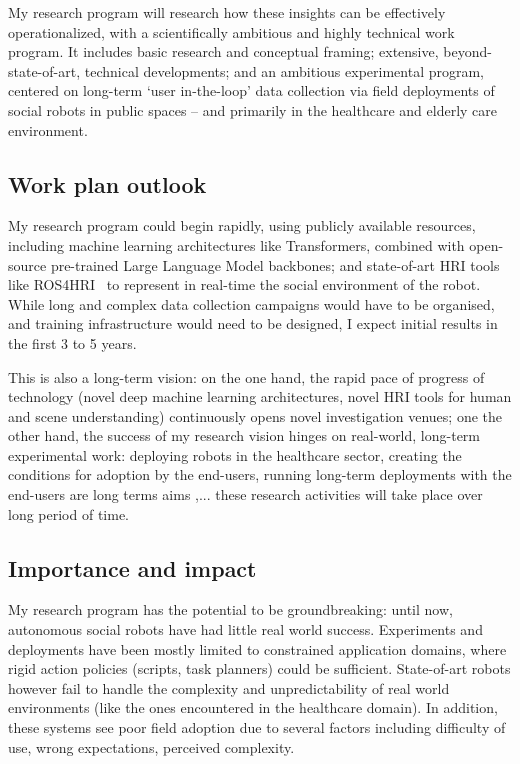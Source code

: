 \vspace{0.4em}

My research program will research how these insights can be effectively
operationalized, with a scientifically ambitious
and highly technical work program. It includes basic research and conceptual
framing; extensive, beyond-state-of-art, technical developments; and an
ambitious experimental program, centered on long-term `user in-the-loop' data
collection via field deployments of social
robots in public spaces -- and primarily in the healthcare and elderly care
environment.


\subsection{Work plan outlook}

My research program could begin rapidly, using publicly available resources,
including machine learning architectures like Transformers, combined with open-source
pre-trained Large Language Model backbones; and state-of-art HRI tools like
ROS4HRI~\autocite{mohamed2021ros4hri} to represent in real-time the social
environment of the robot. While long and complex data collection campaigns would
have to be organised, and training infrastructure would need to
be designed, I expect initial results in the first 3 to 5 years.

This is also a long-term vision: on the one hand, the rapid pace of progress
of technology (novel deep machine learning architectures, novel HRI tools for
human and scene understanding) continuously opens novel investigation
venues; one the other hand, the success of my research vision hinges on
real-world, long-term experimental work: deploying robots in the healthcare
sector, creating the conditions for adoption by the end-users, running
long-term deployments with the end-users are long terms aims
,... these research activities will take
place over long period of time.

\subsection{Importance and impact}

My research program has the potential to be groundbreaking: until now,
autonomous social robots have had little real world success. Experiments and
deployments have been mostly limited to constrained application domains, where
rigid action policies (scripts, task planners) could be sufficient. State-of-art
robots however fail to handle the complexity and unpredictability of real world
environments (like the ones encountered in the healthcare domain). In addition,
these systems see poor field adoption due to several factors including
difficulty of use, wrong expectations, perceived complexity.


